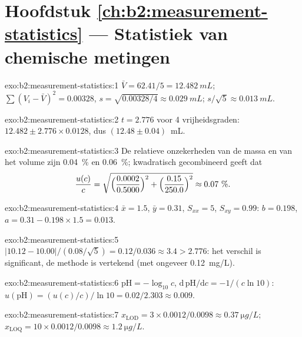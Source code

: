 \section*{Hoofdstuk \ref{ch:b2:measurement-statistics} --- Statistiek van chemische metingen}

\begin{solution}{exo:b2:measurement-statistics:1}
$\bar V = 62.41/5 = \qty{12.482}{mL}$; $\sum(V_i - \bar V)^2 = 0.00328$, $s = \sqrt{0.00328/4} \approx
\qty{0.029}{mL}$; $s/\sqrt5 \approx \qty{0.013}{mL}$.
\end{solution}

\begin{solution}{exo:b2:measurement-statistics:2}
$t = 2.776$ voor 4 vrijheidsgraden: $12.482 \pm 2.776 \times 0.0128$, dus $(12.48 \pm 0.04)$~mL.
\end{solution}

\begin{solution}{exo:b2:measurement-statistics:3}
De relatieve onzekerheden van de massa en van het volume zijn 0.04~\% en 0.06~\%; kwadratisch
gecombineerd geeft dat
\[\frac{u(c)}{c} = \sqrt{\Bigl(\frac{0.0002}{0.5000}\Bigr)^2 + \Bigl(\frac{0.15}{250.0}\Bigr)^2}
\approx 0.07~\%.\]
\end{solution}

\begin{solution}{exo:b2:measurement-statistics:4}
$\bar x = 1.5$, $\bar y = 0.31$, $S_{xx} = 5$, $S_{xy} = 0.99$: $b = 0.198$, $a = 0.31 - 0.198 \times 1.5
= 0.013$.
\end{solution}

\begin{solution}{exo:b2:measurement-statistics:5}
$|10.12 - 10.00|/(0.08/\sqrt5) = 0.12/0.036 \approx 3.4 > 2.776$: het verschil is significant, de
methode is vertekend (met ongeveer \qty{+0.12}{mg/L}).
\end{solution}

\begin{solution}{exo:b2:measurement-statistics:6}
$\mathrm{pH} = -\log_{10}c$, $\mathrm d\,\mathrm{pH}/\mathrm dc = -1/(c\ln10)$:
$u(\mathrm{pH}) = (u(c)/c)/\ln10 = 0.02/2.303 \approx 0.009$.
\end{solution}

\begin{solution}{exo:b2:measurement-statistics:7}
$x_{\mathrm{LOD}} = 3 \times 0.0012/0.0098 \approx \qty{0.37}{\micro g/L}$; $x_{\mathrm{LOQ}} = 10
\times 0.0012/0.0098 \approx \qty{1.2}{\micro g/L}$.
\end{solution}

